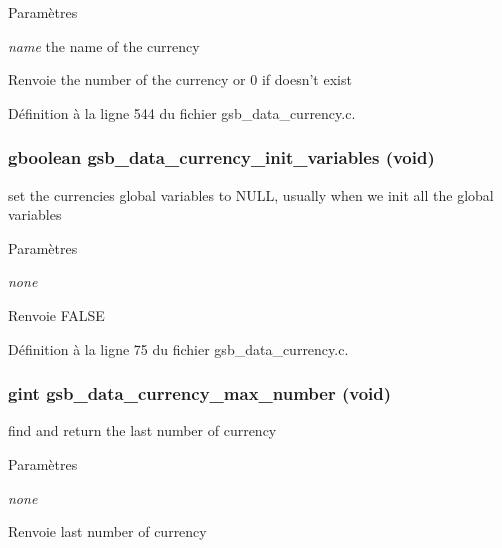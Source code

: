 \begin{DoxyParams}{Paramètres}
\item[{\em name}]the name of the currency\end{DoxyParams}
\begin{DoxyReturn}{Renvoie}
the number of the currency or 0 if doesn't exist 
\end{DoxyReturn}


Définition à la ligne 544 du fichier gsb\_\-data\_\-currency.c.

\subsubsection[{gsb\_\-data\_\-currency\_\-init\_\-variables}]{\setlength{\rightskip}{0pt plus 5cm}gboolean gsb\_\-data\_\-currency\_\-init\_\-variables (void)}\label{gsb__data__currency_8c_a9351bbd5fd673ac0a6ada56badaf82f7}
set the currencies global variables to NULL, usually when we init all the global variables


\begin{DoxyParams}{Paramètres}
\item[{\em none}]\end{DoxyParams}
\begin{DoxyReturn}{Renvoie}
FALSE 
\end{DoxyReturn}


Définition à la ligne 75 du fichier gsb\_\-data\_\-currency.c.

\subsubsection[{gsb\_\-data\_\-currency\_\-max\_\-number}]{\setlength{\rightskip}{0pt plus 5cm}gint gsb\_\-data\_\-currency\_\-max\_\-number (void)}\label{gsb__data__currency_8c_a7f028c9288699445b1173ca81a7471d4}
find and return the last number of currency


\begin{DoxyParams}{Paramètres}
\item[{\em none}]\end{DoxyParams}
\begin{DoxyReturn}{Renvoie}
last number of currency 
\end{DoxyReturn}


